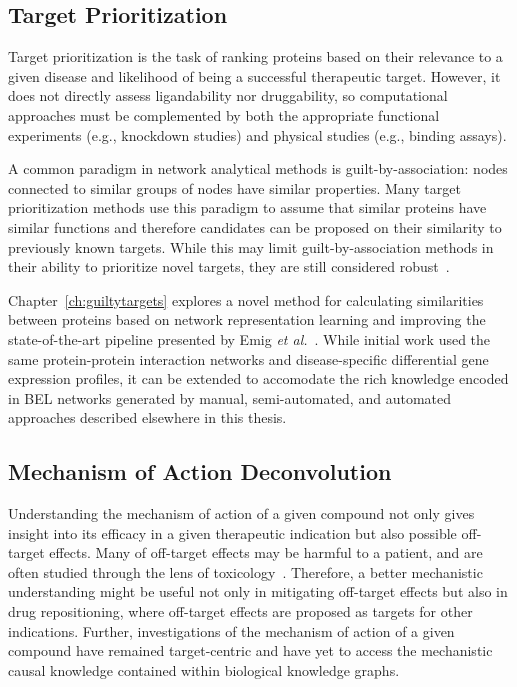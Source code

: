 \subsection{Target Prioritization}

Target prioritization is the task of ranking proteins based on their relevance to a given disease and likelihood of being a successful therapeutic target.
However, it does not directly assess ligandability nor druggability, so computational approaches must be complemented by both the appropriate functional experiments (e.g., knockdown studies) and physical studies (e.g., binding assays).

A common paradigm in network analytical methods is guilt-by-association: nodes connected to similar groups of nodes have similar properties.
Many target prioritization methods use this paradigm to assume that similar proteins have similar functions and therefore candidates can be proposed on their similarity to previously known targets.
While this may limit guilt-by-association methods in their ability to prioritize novel targets, they are still considered robust~\cite{Moreau2012}.

Chapter~\ref{ch:guiltytargets} explores a novel method for calculating similarities between proteins based on network representation learning and improving the state-of-the-art pipeline presented by Emig \textit{et al.}~\cite{Emig2013}.
While initial work used the same protein-protein interaction networks and disease-specific differential gene expression profiles, it can be extended to accomodate the rich knowledge encoded in \ac{BEL} networks generated by manual, semi-automated, and automated approaches described elsewhere in this thesis.

\subsection{Mechanism of Action Deconvolution}

Understanding the mechanism of action of a given compound not only gives insight into its efficacy in a given therapeutic indication but also possible off-target effects.
Many of off-target effects may be harmful to a patient, and are often studied through the lens of toxicology~\cite{Lee2013}.
Therefore, a better mechanistic understanding might be useful not only in mitigating off-target effects but also in drug repositioning, where off-target effects are proposed as targets for other indications.
Further, investigations of the mechanism of action of a given compound have remained target-centric and have yet to access the mechanistic causal knowledge contained within biological knowledge graphs.

